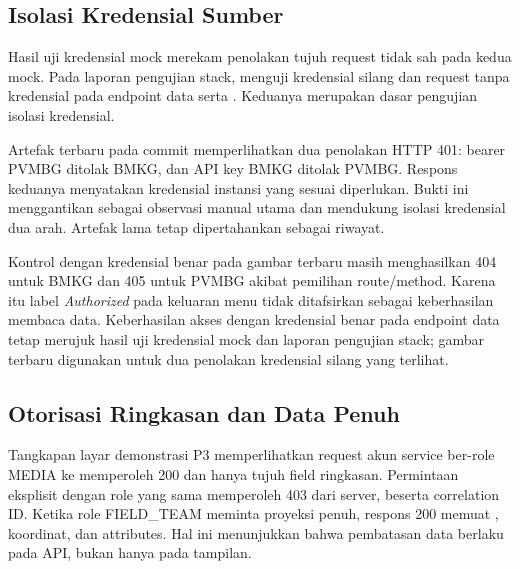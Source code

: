 \subsection{Isolasi Kredensial Sumber}
Hasil uji kredensial mock merekam penolakan tujuh request tidak sah pada kedua mock. Pada laporan pengujian stack,  menguji kredensial silang dan request tanpa kredensial pada endpoint data  serta . Keduanya merupakan dasar pengujian isolasi kredensial.

Artefak terbaru  pada commit  memperlihatkan dua penolakan HTTP 401: bearer PVMBG ditolak BMKG, dan API key BMKG ditolak PVMBG. Respons keduanya menyatakan kredensial instansi yang sesuai diperlukan. Bukti ini menggantikan  sebagai observasi manual utama dan mendukung isolasi kredensial dua arah. Artefak lama tetap dipertahankan sebagai riwayat.

Kontrol dengan kredensial benar pada gambar terbaru masih menghasilkan 404 untuk BMKG dan 405 untuk PVMBG akibat pemilihan route/method. Karena itu label \emph{Authorized} pada keluaran menu tidak ditafsirkan sebagai keberhasilan membaca data. Keberhasilan akses dengan kredensial benar pada endpoint data tetap merujuk hasil uji kredensial mock dan laporan pengujian stack; gambar terbaru digunakan untuk dua penolakan kredensial silang yang terlihat.


\subsection{Otorisasi Ringkasan dan Data Penuh}
Tangkapan layar demonstrasi P3 memperlihatkan request akun service ber-role MEDIA ke  memperoleh 200 dan hanya tujuh field ringkasan. Permintaan eksplisit  dengan role yang sama memperoleh 403 dari server, beserta correlation ID. Ketika role FIELD\_TEAM meminta proyeksi penuh, respons 200 memuat , koordinat, dan attributes. Hal ini menunjukkan bahwa pembatasan data berlaku pada API, bukan hanya pada tampilan.


